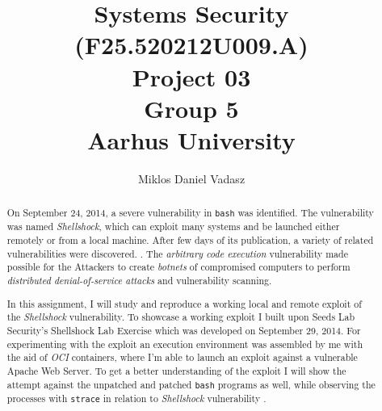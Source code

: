 \documentclass[12pt,a4paper,twocolumn]{article}
\title{ Systems Security (F25.520212U009.A) \\
        Project 03 \\
        Group 5 \\
        Aarhus University%
}
\author{Miklos Daniel Vadasz}
\begin{document}
\maketitle\thispagestyle{empty}
\makeatletter

\newpage
\tableofcontents\thispagestyle{empty}
\newpage

\thispagestyle{empty}

\begin{abstract}
On September 24, 2014, a severe vulnerability in \lstinline{bash}\cite{shell.bash} was identified.
The vulnerability was named \textit{Shellshock}\cite{shellshock.CVE-2014-6271}, which can exploit many systems and be launched either remotely or from a local machine. After few days of its publication, a variety of related vulnerabilities were discovered. \cite{shellshock.CVE-2014-6277, shellshock.CVE-2014-6278, shellshock.CVE-2014-7169, shellshock.CVE-2014-7186, shellshock.CVE-2014-7186, shellshock.CVE-2014-7187}. The \textit{arbitrary code execution} \cite{secdef.ace} vulnerability made possible for the Attackers to create \textit{botnets}\cite{secdef.botnet} of compromised computers to perform \textit{distributed denial-of-service attacks}\cite{secdef.ddos} and vulnerability scanning.

In this assignment, I will study and reproduce a working local and remote exploit of the \textit{Shellshock} vulnerability.  To showcase a working exploit I built upon Seeds Lab Security's Shellshock Lab Exercise\cite{seedlabshellshockattack} which was developed on September 29, 2014. For experimenting with the exploit an execution environment was assembled by me with the aid of \textit{OCI} containers\cite{podman,oci.containers}, where I'm able to launch an exploit against a vulnerable Apache Web Server\cite{http.apache}. To get a better understanding of the exploit  I will show the attempt against the unpatched and patched \lstinline{bash} programs as well, while observing the processes with \lstinline{strace}\cite{diag.strace} in relation to \textit{Shellshock} vulnerability \cite{shellshock.CVE-2014-6278, shellshock.CVE-2014-6271} .

\end{abstract}

\newpage
\end{document}
